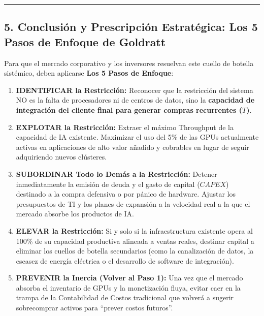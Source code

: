 \documentclass[12pt,letterpaper]{article}
\providecommand{\tightlist}{%
  \setlength{\itemsep}{0pt}\setlength{\parskip}{0pt}}
\begin{document}
\begin{center}\rule{0.5\linewidth}{0.5pt}\end{center}

\hypertarget{conclusiuxf3n-y-prescripciuxf3n-estratuxe9gica-los-5-pasos-de-enfoque-de-goldratt}{%
\subsection{5. Conclusión y Prescripción Estratégica: Los 5 Pasos de
Enfoque de
Goldratt}\label{conclusiuxf3n-y-prescripciuxf3n-estratuxe9gica-los-5-pasos-de-enfoque-de-goldratt}}

Para que el mercado corporativo y los inversores resuelvan este cuello
de botella sistémico, deben aplicarse \textbf{Los 5 Pasos de Enfoque}:

\begin{enumerate}
\def\labelenumi{\arabic{enumi}.}
\tightlist
\item
  \textbf{IDENTIFICAR la Restricción:} Reconocer que la restricción del
  sistema NO es la falta de procesadores ni de centros de datos, sino la
  \textbf{capacidad de integración del cliente final para generar
  compras recurrentes (\(T\))}.
\item
  \textbf{EXPLOTAR la Restricción:} Extraer el máximo Throughput de la
  capacidad de IA existente. Maximizar el uso del 5\% de las GPUs
  actualmente activas en aplicaciones de alto valor añadido y cobrables
  en lugar de seguir adquiriendo nuevos clústeres.
\item
  \textbf{SUBORDINAR Todo lo Demás a la Restricción:} Detener
  inmediatamente la emisión de deuda y el gasto de capital (\(CAPEX\))
  destinado a la compra defensiva o por pánico de hardware. Ajustar los
  presupuestos de TI y los planes de expansión a la velocidad real a la
  que el mercado absorbe los productos de IA.
\item
  \textbf{ELEVAR la Restricción:} Si y solo si la infraestructura
  existente opera al 100\% de su capacidad productiva alineada a ventas
  reales, destinar capital a eliminar los cuellos de botella secundarios
  (como la canalización de datos, la escasez de energía eléctrica o el
  desarrollo de software de integración).
\item
  \textbf{PREVENIR la Inercia (Volver al Paso 1):} Una vez que el
  mercado absorba el inventario de GPUs y la monetización fluya, evitar
  caer en la trampa de la Contabilidad de Costos tradicional que volverá
  a sugerir sobrecomprar activos para ``prever costos futuros''.
\end{enumerate}
\end{document}
